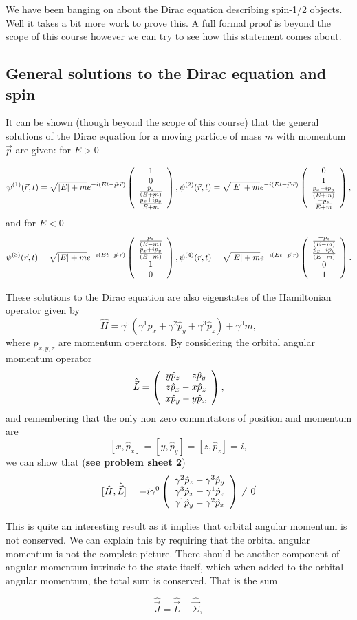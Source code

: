 We have been banging on about the Dirac equation describing spin-1/2 objects. Well it takes a bit more work to prove this. A full formal proof is beyond the scope of this course however we can try to see how this statement comes about.

\subsection{General solutions to the Dirac equation and spin}

It can be shown (though beyond the scope of this course) that the general solutions of the Dirac equation for a moving particle of mass $m$ with momentum $\vec{p}$ are given: for $E>0$
   
\[\psi^{(1)}(\vec{r},t)=\sqrt{|E|+m}  e^{-i(Et-\vec{p}\cdot\vec{r})}
 \left( \begin{array}{c} 1 \\ 0 \\ \frac{p_z}{(E+m)} \\ \frac{p_x+ip_y}{E+m}\end{array} \right),
\psi^{(2)}(\vec{r},t)=\sqrt{|E|+m}
e^{-i(Et-\vec{p}\cdot\vec{r})} \left( \begin{array}{c} 0 \\ 1 \\ \frac{p_x-ip_y}{(E+m)} \\ \frac{-p_z}{E+m}\end{array} \right),
\] 
and for $E<0$
\[
\psi^{(3)}(\vec{r},t)=\sqrt{|E|+m}  e^{-i(Et-\vec{p}\cdot\vec{r})}
 \left( \begin{array}{c} \frac{p_z}{(E-m)} \\ \frac{p_x+ip_y}{(E-m)} \\ 1 \\ 0\end{array} \right),
\psi^{(4)}(\vec{r},t)=\sqrt{|E|+m}  e^{-i(Et-\vec{p}\cdot\vec{r})}
 \left( \begin{array}{c} \frac{-p_z}{(E-m)} \\ \frac{p_x-ip_y}{(E-m)} \\ 0 \\ 1\end{array} \right).
\] 

These solutions to the Dirac equation are also eigenstates of the Hamiltonian operator given by
\[
 \hat{H} = \gamma^{0}(\gamma^1\hat{p}_x+ \gamma^2\hat{p}_y + \gamma^3\hat{p}_z)+\gamma^{0}m, 
\]
where $\hat{p}_{x,y,z}$ are momentum operators.
By considering the orbital angular momentum operator 
\[\hat{\vec{L}} =
 \left( \begin{array}{c} y\hat{p}_z-z\hat{p}_y \\ z\hat{p}_x-x\hat{p}_z \\ x\hat{p}_y-y\hat{p}_x\end{array} \right),\]
and remembering that the only non zero commutators of position and momentum are 
\[ [x,\hat{p}_x] = [y,\hat{p}_y] =  [z,\hat{p}_z] =
  i, 
\]
we can show that ({\bf see problem sheet 2})\[
[\hat{H},\hat{\vec{L}}] =
-i\gamma^{0} \left( \begin{array}{c} \gamma^2\hat{p}_z-\gamma^3\hat{p}_y \\ \gamma^3\hat{p}_x-\gamma^1\hat{p}_z \\ \gamma^1\hat{p}_y-\gamma^2\hat{p}_x\end{array} \right)\neq\vec{0}
\]

This is quite an interesting result as it implies that orbital angular momentum is not conserved. We can explain this by requiring that the orbital angular momentum is not the complete picture. There should be another component of angular momentum intrinsic to the state itself, which when added to the orbital angular momentum, the total sum is conserved. That is the sum

\[\hat{\vec{J}}=\hat{\vec{L}}+\hat{\vec{\Sigma}},\]

